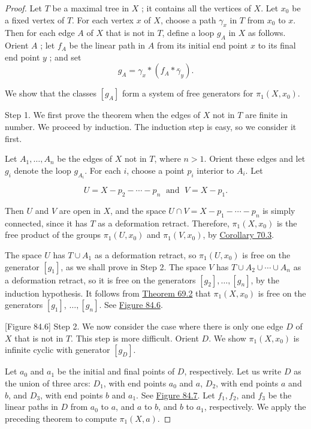 \begin{proof}
	Let \(T\) be a maximal tree in \(X\) ; it contains all the vertices of \(X\). Let \(x_{0}\) be a fixed vertex of \(T\). For each vertex \(x\) of \(X\), choose a path \({\gamma }_{x}\) in \(T\) from \(x_{0}\) to \(x\). Then for each edge \(A\) of \(X\) that is not in \(T\), define a loop \(g_{A}\) in \(X\) as follows. Orient \(A\) ; let \(f_{A}\) be the linear path in \(A\) from its initial end point \(x\) to its final end point \(y\) ; and set
\[
g_{A} = {\gamma }_{x} * ( {f_{A} * \bar{\gamma }_{y}}).
\]

We show that the classes \([ g_{A}]\) form a system of free generators for \({\pi }_{1}( {X,x_{0}})\).

Step 1. We first prove the theorem when the edges of \(X\) not in \(T\) are finite in number. We proceed by induction. The induction step is easy, so we consider it first.

Let \(A_{1},\ldots ,A_{n}\) be the edges of \(X\) not in \(T\), where \(n > 1\). Orient these edges and let \(g_{i}\) denote the loop \(g_{A_{i}}\). For each \(i\), choose a point \(p_{i}\) interior to \(A_{i}\). Let

\[
U = X - p_{2} - \cdots - p_{n}\;\text{ and }\;V = X - p_{1}.
\]

Then \(U\) and \(V\) are open in \(X\), and the space \(U \cap V = X - p_{1} - \cdots - p_{n}\) is simply connected, since it has \(T\) as a deformation retract. Therefore, \({\pi }_{1}( {X,x_{0}})\) is the free product of the groups \({\pi }_{1}( {U,x_{0}})\) and \({\pi }_{1}( {V,x_{0}})\), by \hyperref[cor:70.3]{Corollary 70.3}.

The space \(U\) has \(T \cup {A}_{1}\) as a deformation retract, so \({\pi }_{1}( {U,x_{0}})\) is free on the generator \([ g_{1}]\), as we shall prove in Step 2. The space \(V\) has \(T \cup {A}_{2} \cup \cdots \cup {A}_{n}\) as a deformation retract, so it is free on the generators \([ g_{2}] ,\ldots ,[ g_{n}]\), by the induction hypothesis. It follows from \hyperref[thm:69.2]{Theorem 69.2} that \({\pi }_{1}( {X,x_{0}})\) is free on the generators \([ g_{1}]\), \(\ldots ,[ g_{n}]\). See \hyperref[fig:84.6]{Figure 84.6}.

[Figure 84.6]
Step 2. We now consider the case where there is only one edge \(D\) of \(X\) that is not in \(T\). This step is more difficult. Orient \(D\). We show \({\pi }_{1}( {X,x_{0}})\) is infinite cyclic with generator \([ g_{D}]\).

Let \(a_{0}\) and \(a_{1}\) be the initial and final points of \(D\), respectively. Let us write \(D\) as the union of three arcs: \(D_{1}\), with end points \(a_{0}\) and \(a\), \(D_{2}\), with end points \(a\) and \(b\), and \(D_{3}\), with end points \(b\) and \(a_{1}\). See \hyperref[fig:84.7]{Figure 84.7}. Let \(f_{1},f_{2}\), and \(f_{3}\) be the linear paths in \(D\) from \(a_{0}\) to \(a\), and \(a\) to \(b\), and \(b\) to \(a_{1}\), respectively. We apply the preceding theorem to compute \({\pi }_{1}( {X,a})\).


\end{proof}
